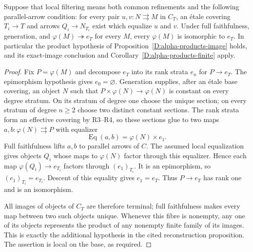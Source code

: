 \begin{proposition}
\label{D:alpha-strict-filtering}
Suppose that local filtering means both common refinements and the
following parallel-arrow condition: for every pair $u,v:N\rightrightarrows M$
in $C_T$, an \'etale covering $T_i\to T$ and arrows $Q_i\to N_{T_i}$
exist which equalize $u$ and $v$. Under full faithfulness, generation,
and $\varphi(M)\twoheadrightarrow e_T$ for every $M$, every
$\varphi(M)$ is isomorphic to $e_T$. In particular the product hypothesis
of Proposition~\ref{D:alpha-products-image} holds, and its exact-image
conclusion and Corollary~\ref{D:alpha-products-finite} apply.
\end{proposition}
\begin{proof}
Fix $P=\varphi(M)$ and decompose $e_T$ into its rank strata $e_n$
for $P\to e_T$. The epimorphism hypothesis gives $e_0=\varnothing$.
Generation supplies, after an \'etale base covering, an object $N$
such that $P\times\varphi(N)\to\varphi(N)$ is constant on every
degree stratum. On its stratum of degree one choose the unique
section; on every stratum of degree $n\geq2$ choose two distinct
constant sections. The rank strata form an effective covering by
R3--R4, so these sections glue to two maps
$a,b:\varphi(N)\rightrightarrows P$ with equalizer
\[
 \operatorname{Eq}(a,b)=\varphi(N)\times e_1.
\]
Full faithfulness lifts $a,b$ to parallel arrows of $C$. The assumed
local equalization gives objects $Q_i$ whose maps to $\varphi(N)$
factor through this equalizer. Hence each map
$\varphi(Q_i)\to e_{T_i}$ factors through $(e_1)_{T_i}$.
It is an epimorphism, so $(e_1)_{T_i}=e_{T_i}$. Descent of this
equality gives $e_1=e_T$. Thus $P\to e_T$ has rank one and is
an isomorphism.

All images of objects of $C_T$ are therefore terminal; full
faithfulness makes every map between two such objects unique.
Whenever this fibre is nonempty, any one of its objects represents
the product of any nonempty finite family of its images. This is
exactly the additional hypothesis in the cited reconstruction
proposition. The assertion is local on the base, as required.
\end{proof}

